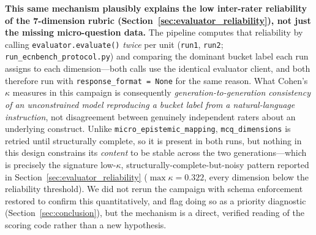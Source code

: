 \documentclass[11pt,journal,onecolumn]{IEEEtran}
\begin{document}
\textbf{This same mechanism plausibly explains the low inter-rater reliability of the 7-dimension rubric (Section~\ref{sec:evaluator_reliability}), not just the missing micro-question data.} The pipeline computes that reliability by calling \texttt{evaluator.evaluate()} \emph{twice} per unit (\texttt{run1}, \texttt{run2}; \texttt{run\_ecnbench\_protocol.py}) and comparing the dominant bucket label each run assigns to each dimension---both calls use the identical evaluator client, and both therefore run with \texttt{response\_format = None} for the same reason. What Cohen's $\kappa$ measures in this campaign is consequently \emph{generation-to-generation consistency of an unconstrained model reproducing a bucket label from a natural-language instruction}, not disagreement between genuinely independent raters about an underlying construct. Unlike \texttt{micro\_epistemic\_mapping}, \texttt{mcq\_dimensions} is retried until structurally complete, so it is present in both runs, but nothing in this design constrains its \emph{content} to be stable across the two generations---which is precisely the signature low-$\kappa$, structurally-complete-but-noisy pattern reported in Section~\ref{sec:evaluator_reliability} ($\max \kappa = 0.322$, every dimension below the reliability threshold). We did not rerun the campaign with schema enforcement restored to confirm this quantitatively, and flag doing so as a priority diagnostic (Section~\ref{sec:conclusion}), but the mechanism is a direct, verified reading of the scoring code rather than a new hypothesis.
\end{document}
